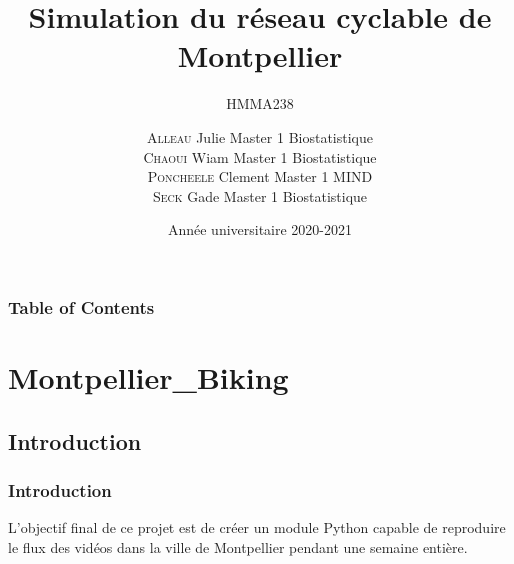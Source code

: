 \documentclass{beamer}
\title[] %
{Simulation du réseau cyclable de Montpellier}
\subtitle{HMMA238}
\author[]
{
\textsc{Alleau} Julie {\sc }  Master 1 Biostatistique \\  
\textsc{Chaoui} Wiam {\sc }   Master 1 Biostatistique\\  
\textsc{Poncheele} Clement {\sc }  Master 1 MIND     \\
\textsc{Seck} Gade {\sc }  Master 1 Biostatistique \\}
\date[]  %
{Année universitaire 2020-2021}
\begin{document}
\frame{\titlepage}

\begin{frame}
\frametitle{Table of Contents}
    \tableofcontents
\end{frame}


\section{Montpellier\_Biking}
\subsection{Introduction}

\begin{frame}
\frametitle{Introduction}
L'objectif final de ce projet est de créer un module Python capable de reproduire le flux des vidéos dans la ville de Montpellier pendant une semaine entière.
\end{frame}
\end{document}
